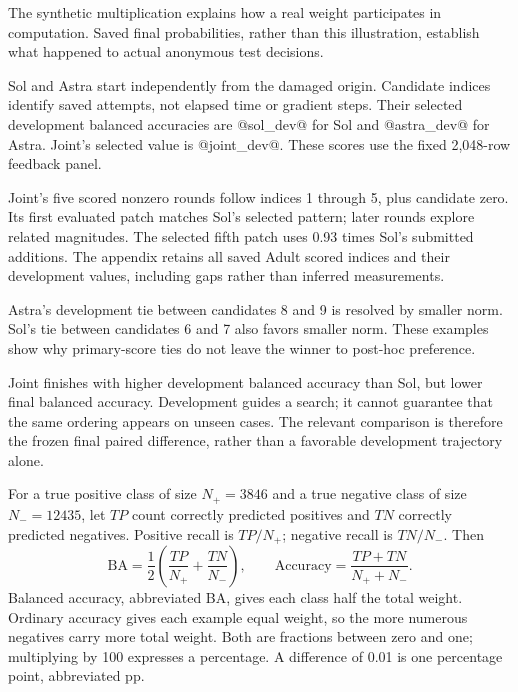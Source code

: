 
The synthetic multiplication explains how a real weight participates in computation. Saved final probabilities, rather than this illustration, establish what happened to actual anonymous test decisions.

Sol and Astra start independently from the damaged origin. Candidate indices identify saved attempts, not elapsed time or gradient steps. Their selected development balanced accuracies are @sol_dev@ for Sol and @astra_dev@ for Astra. Joint's selected value is @joint_dev@. These scores use the fixed 2,048-row feedback panel.


Joint's five scored nonzero rounds follow indices 1 through 5, plus candidate zero. Its first evaluated patch matches Sol's selected pattern; later rounds explore related magnitudes. The selected fifth patch uses 0.93 times Sol's submitted additions. The appendix retains all saved Adult scored indices and their development values, including gaps rather than inferred measurements.

Astra's development tie between candidates 8 and 9 is resolved by smaller norm. Sol's tie between candidates 6 and 7 also favors smaller norm. These examples show why primary-score ties do not leave the winner to post-hoc preference.

Joint finishes with higher development balanced accuracy than Sol, but lower final balanced accuracy. Development guides a search; it cannot guarantee that the same ordering appears on unseen cases. The relevant comparison is therefore the frozen final paired difference, rather than a favorable development trajectory alone.

For a true positive class of size $N_+=3846$ and a true negative class of size $N_-=12435$, let $TP$ count correctly predicted positives and $TN$ correctly predicted negatives. Positive recall is $TP/N_+$; negative recall is $TN/N_-$. Then
\[
\mathrm{BA}=\frac12\left(\frac{TP}{N_+}+\frac{TN}{N_-}\right),\qquad
\mathrm{Accuracy}=\frac{TP+TN}{N_++N_-}.
\]
Balanced accuracy, abbreviated BA, gives each class half the total weight. Ordinary accuracy gives each example equal weight, so the more numerous negatives carry more total weight. Both are fractions between zero and one; multiplying by 100 expresses a percentage. A difference of 0.01 is one percentage point, abbreviated pp.

